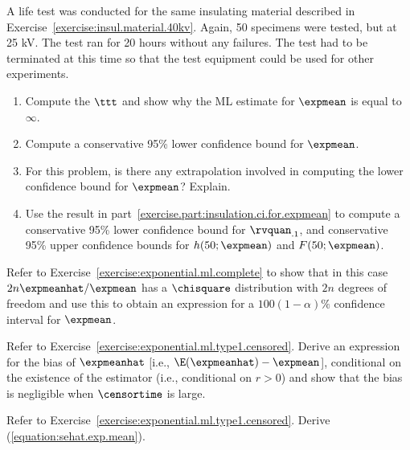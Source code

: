 \begin{exercise}
A life test was conducted for the same insulating material described
in Exercise~\ref{exercise:insul.material.40kv}.  Again, 50 specimens
were tested, but at 25 kV. The test ran for 20 hours without any
failures. The test had to be terminated at this time so that the
test equipment could be used for other experiments.
\begin{enumerate}
\item	
Compute the $\ttt$ and show why the ML estimate for $\expmean$
is equal to $\infty$.
\item
\label{exercise.part:insulation.ci.for.expmean}
Compute a conservative 95\% lower confidence bound for $\expmean$.
\item	
For this problem, is there any extrapolation involved in 
computing the lower confidence bound for $\expmean$? Explain.
\item	
Use the result in part~\ref{exercise.part:insulation.ci.for.expmean}
to compute a conservative 95\% lower confidence bound for
$\rvquan_{.1}$, and conservative 95\% upper confidence bounds
for $h(50;\expmean)$ and $F(50;\expmean)$.
\end{enumerate}
\end{exercise}

\begin{exercise1}
Refer to Exercise~\ref{exercise:exponential.ml.complete} to show that
in this case $2 n \expmeanhat /\expmean$ has a $\chisquare$
distribution with $2n$ degrees of freedom and use this to obtain an
expression for a $100(1-\alpha)\%$ confidence interval for $\expmean$.
\end{exercise1}

\begin{exercise1}
Refer to Exercise~\ref{exercise:exponential.ml.type1.censored}.
Derive an expression for the bias of $\expmeanhat$ [i.e.,
$\E(\expmeanhat) -\expmean$], conditional on the existence of the
estimator (i.e., conditional on $r>0$) and show that the bias is
negligible when $\censortime$ is large.
\end{exercise1}

\begin{exercise1}
Refer to Exercise~\ref{exercise:exponential.ml.type1.censored}.
Derive (\ref{equation:sehat.exp.mean}).
\end{exercise1}

